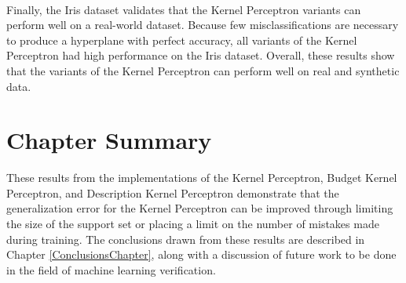 \\Finally, the Iris dataset validates that the Kernel Perceptron variants can perform well on a real-world dataset. Because few misclassifications are necessary to produce a hyperplane with perfect accuracy, all variants of the Kernel Perceptron had high performance on the Iris dataset. Overall, these results show that the variants of the Kernel Perceptron can perform well on real and synthetic data.
\section{Chapter Summary}\label{ResultsChapterSummarySection}
These results from the implementations of the Kernel Perceptron, Budget Kernel Perceptron, and Description Kernel Perceptron demonstrate that the generalization error for the Kernel Perceptron can be improved through limiting the size of the support set or placing a limit on the number of mistakes made during training. The conclusions drawn from these results are described in Chapter \ref{ConclusionsChapter}, along with a discussion of future work to be done in the field of machine learning verification.

